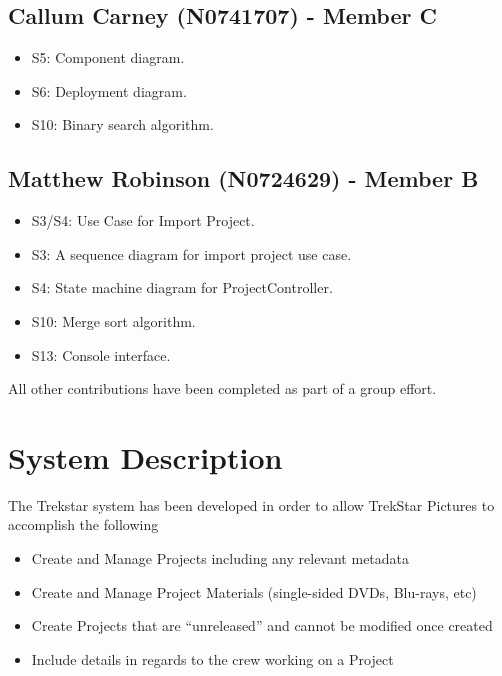\documentclass[
  english,
  a4paper,
,tablecaptionabove
]{scrartcl}
\providecommand{\tightlist}{%
  \setlength{\itemsep}{0pt}\setlength{\parskip}{0pt}}
\begin{document}
\hypertarget{callum-carney-n0741707---member-c}{%
\subsection{Callum Carney (N0741707) - Member
C}\label{callum-carney-n0741707---member-c}}

\begin{itemize}
\tightlist
\item
  S5: Component diagram.
\item
  S6: Deployment diagram.
\item
  S10: Binary search algorithm.
\end{itemize}

\hypertarget{matthew-robinson-n0724629---member-b}{%
\subsection{Matthew Robinson (N0724629) - Member
B}\label{matthew-robinson-n0724629---member-b}}

\begin{itemize}
\tightlist
\item
  S3/S4: Use Case for Import Project.
\item
  S3: A sequence diagram for import project use case.
\item
  S4: State machine diagram for ProjectController.
\item
  S10: Merge sort algorithm.
\item
  S13: Console interface.
\end{itemize}

All other contributions have been completed as part of a group effort.

\newpage

\hypertarget{system-description}{%
\section{System Description}\label{system-description}}

The Trekstar system has been developed in order to allow TrekStar
Pictures to accomplish the following

\begin{itemize}
\tightlist
\item
  Create and Manage Projects including any relevant metadata
\item
  Create and Manage Project Materials (single-sided DVDs, Blu-rays, etc)
\item
  Create Projects that are \enquote{unreleased} and cannot be modified
  once created
\item
  Include details in regards to the crew working on a Project
\end{itemize}
\end{document}
